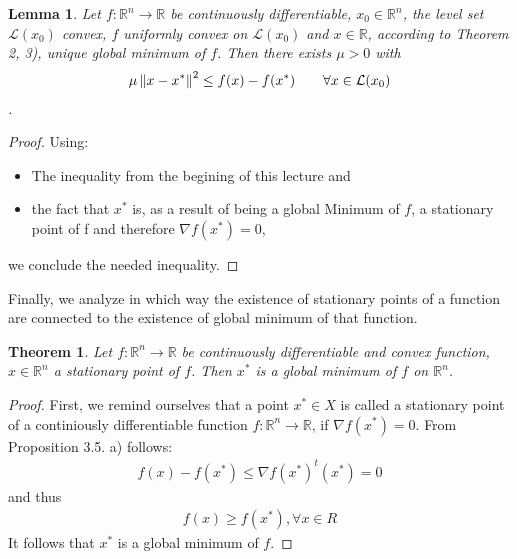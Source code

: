 \documentclass[a4paper, 11pt]{report}
\theoremstyle{break}
\newtheorem{lemma}[definition]{Lemma}
\newtheorem{theorem}[definition]{Theorem}
\theoremstyle{proofstyle}
\newtheorem{proof}{Proof}
\newcommand{\R}{\mathbb{R}}
\begin{document}
\begin{lemma}
	Let $f:\R^n\rightarrow\R$ be continuously differentiable, $x_0 \in\R^n$, the level set $\mathcal{L}(x_0)$ convex, $f$ uniformly convex on $\mathcal{L}(x_0)$ and $x \in\R$, according to Theorem 2, 3), unique global minimum of $f$. Then there exists $\mu>0$ with
	\begin{align*}
	\mu \left\lVert x-x^* \right\Vert^2 \leq f(x)-f(x^*) \qquad \forall \bigskip x \in \mathcal{L}(x_0)
	\end{align*}. 
\end{lemma}

\begin{proof}
	Using: 
	\begin{itemize}
		\item The inequality  from the begining of this lecture and 
		\item the fact that $x^*$ is, as a result of being a global Minimum of $f$, a stationary point of f and therefore $\nabla f(x^*)=0$,
	\end{itemize}
	we conclude the needed inequality.
\end{proof}
    
Finally, we analyze in which way the existence of stationary points of a function are connected to the existence of global minimum of that function.

\begin{theorem}
	Let $f:\R^n\rightarrow\R$ be continuously differentiable and convex function, $x\in\R^n$ a stationary point of $f$. Then $x^*$ is a global minimum of $f$ on $\R^n$. 
\end{theorem}

\begin{proof}
	First, we remind ourselves that a point $x^*\in X$ is called a stationary point of a continiously differentiable function $f:\R^n\rightarrow\R$, if $\nabla f(x^*)=0$.
	From Proposition 3.5. a) follows: 
	\begin{align*}
	    f(x)-f(x^*)\leq\nabla f(x^*)^t (x^*)=0
	\end{align*}
	and thus 
	\begin{align*}
	    f(x)\geq f(x^*), \forall x\in R
	\end{align*}
	It follows that $x^*$ is a global minimum of $f$.
\end{proof}
\end{document}
